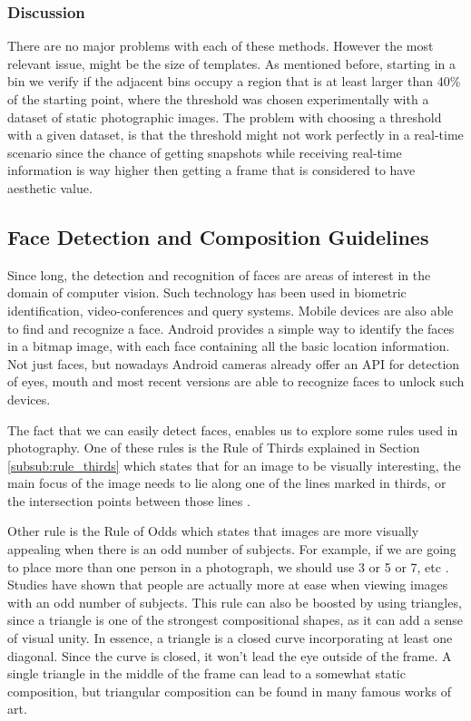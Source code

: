 \subsubsection{Discussion}

There are no major problems with each of these methods. However the most relevant issue, might be the size of templates. As mentioned before, starting in a bin we verify if the adjacent bins occupy a region that is at least larger than 40\% of the starting point, where the threshold was chosen experimentally with a dataset of static photographic images. The problem with choosing a threshold with a given dataset, is that the threshold might not work perfectly in a real-time scenario since the chance of getting snapshots while receiving real-time information is way higher then getting a frame that is considered to have aesthetic value.

\subsection{Face Detection and Composition Guidelines}
\label{sub:face_guidelines}

Since long, the detection and recognition of faces are areas of interest in the domain of computer vision. Such technology has been used in biometric identification, video-conferences and query systems.
Mobile devices are also able to find and recognize a face. Android provides a simple way to identify the faces in a bitmap image, with each face containing all the basic location information. Not just faces, but nowadays Android cameras already offer an API for detection of eyes, mouth and most recent versions are able to recognize faces to unlock such devices.

The fact that we can easily detect faces, enables us to explore some rules used in photography. One of these rules is the Rule of Thirds explained in Section \ref{subsub:rule_thirds} which states that for an image to be visually interesting, the main focus of the image needs to lie along one of the lines marked in thirds, or the intersection points between those lines \cite{kamps2012rules}.

Other rule is the Rule of Odds which states that images are more visually appealing when there is an odd number of subjects. For example, if we are going to place more than one person in a photograph, we should use 3 or 5 or 7, etc \cite{kamps2012rules}. Studies have shown that people are actually more at ease when viewing images with an odd number of subjects. This rule can also be boosted by using triangles, since a triangle is one of the strongest compositional shapes, as it can add a sense of visual unity. In essence, a triangle is a closed curve incorporating at least one diagonal. Since the curve is closed, it won't lead the eye outside of the frame. A single triangle in the middle of the frame can lead to a somewhat static composition, but triangular composition can be found in many famous works of art.

